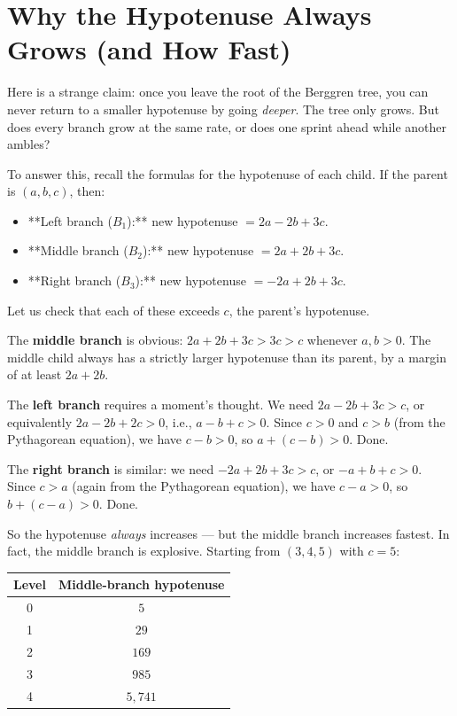 \bigskip


\section{Why the Hypotenuse Always Grows (and How Fast)}

Here is a strange claim: once you leave the root of the Berggren tree, you can never return to a smaller hypotenuse by going \textit{deeper}. The tree only grows. But does every branch grow at the same rate, or does one sprint ahead while another ambles?

To answer this, recall the formulas for the hypotenuse of each child. If the parent is $(a, b, c)$, then:

\begin{itemize}
\item **Left branch ($B_1$):** new hypotenuse $= 2a - 2b + 3c$.
\item **Middle branch ($B_2$):** new hypotenuse $= 2a + 2b + 3c$.
\item **Right branch ($B_3$):** new hypotenuse $= -2a + 2b + 3c$.
\end{itemize}
Let us check that each of these exceeds $c$, the parent's hypotenuse.

The \textbf{middle branch} is obvious: $2a + 2b + 3c > 3c > c$ whenever $a, b > 0$. The middle child always has a strictly larger hypotenuse than its parent, by a margin of at least $2a + 2b$.

The \textbf{left branch} requires a moment's thought. We need $2a - 2b + 3c > c$, or equivalently $2a - 2b + 2c > 0$, i.e., $a - b + c > 0$. Since $c > 0$ and $c > b$ (from the Pythagorean equation), we have $c - b > 0$, so $a + (c - b) > 0$. Done.

The \textbf{right branch} is similar: we need $-2a + 2b + 3c > c$, or $-a + b + c > 0$. Since $c > a$ (again from the Pythagorean equation), we have $c - a > 0$, so $b + (c - a) > 0$. Done.

So the hypotenuse \textit{always} increases --- but the middle branch increases fastest. In fact, the middle branch is explosive. Starting from $(3, 4, 5)$ with $c = 5$:

\begin{center}
\begin{tabular}{c c}
\toprule
Level & Middle-branch hypotenuse \\
\midrule
0 & $5$ \\
1 & $29$ \\
2 & $169$ \\
3 & $985$ \\
4 & $5{,}741$ \\
\bottomrule
\end{tabular}
\end{center}

